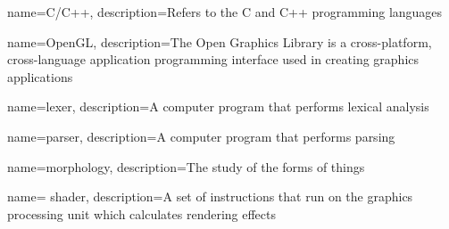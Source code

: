 {
	name=C/C++, 
	description={Refers to the C and C++ programming languages}
}

{
	name=OpenGL, 
	description={The Open Graphics Library is a cross-platform, cross-language application programming interface used in creating graphics applications}
}

{
	name=lexer, 
	description={A computer program that performs lexical analysis}
}

{
	name=parser,
	description={A computer program that performs parsing}
}

{
	name=morphology, 
	description={The study of the forms of things}
}

{
	name= shader, 
	description={A set of instructions that run on the graphics processing unit which calculates rendering effects}
}


